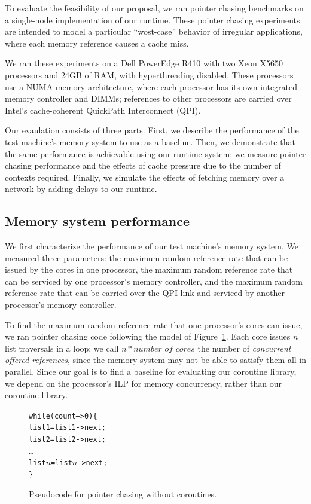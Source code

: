 \documentclass{acm_proc_article-sp}
\begin{document}
To evaluate the feasibility of our proposal, we ran pointer chasing
benchmarks on a single-node implementation of our runtime. These
pointer chasing experiments are intended to model a particular
``wost-case'' behavior of irregular applications, where each memory
reference causes a cache miss.

We ran these experiments on a Dell PowerEdge R410 with two Xeon X5650
processors and 24GB of RAM, with hyperthreading disabled. These
processors use a NUMA memory architecture, where each processor has
its own integrated memory controller and DIMMs; references to other
processors are carried over Intel's cache-coherent QuickPath
Interconnect (QPI).

Our evaulation consists of three parts. First, we describe the
performance of the test machine's memory system to use as a
baseline. Then, we demonstrate that the same performance is achievable
using our runtime system: we measure pointer chasing performance and
the effects of cache pressure due to the number of contexts
required. Finally, we simulate the effects of fetching memory over a
network by adding delays to our runtime.

\subsection{Memory system performance}

We first characterize the performance of our test machine's memory
system. We measured three parameters: the maximum random reference
rate that can be issued by the cores in one processor, the maximum random
reference rate that can be serviced by one processor's memory controller,
and the maximum random reference rate that can be carried over the QPI
link and serviced by another processor's memory controller.

To find the maximum random reference rate that one processor's cores
can issue, we ran pointer chasing code following the model of
Figure~\ref{fig:pointernocoro}. Each core issues $n$ list traversals
in a loop; we call $n * \textit{number of cores}$ the number of
{\em concurrent offered references}, since the memory system may not
be able to satisfy them all in parallel. Since our goal is to find a
baseline for evaluating our coroutine library, we depend on the
processor's ILP for memory concurrency, rather than our coroutine
library.

\begin{figure}
\begin{alltt}
  while (count-- > 0) \{
    list1 = list1->next;
    list2 = list2->next;
    \ldots
    list\(n\) = list\(n\)->next;
  \}
\end{alltt}
\caption{Pseudocode for pointer chasing without coroutines.}
\label{fig:pointernocoro}
\end{figure}
\end{document}
